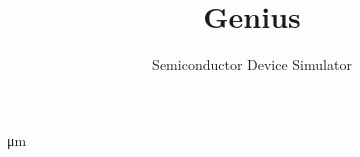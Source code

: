 \documentclass{cgdmanen}
\begin{document}
\setcounter{page}{-20}
\title{Genius}
\subtitle{Semiconductor Device Simulator}
\date{}
\maketitle


\clearpage\pagestyle{empty}
\tableofcontents{}

\clearpage\pagestyle{heading}\setcounter{page}{1}

\SI{}{\micro\meter}





\printindex{}
\backcover
\end{document}
